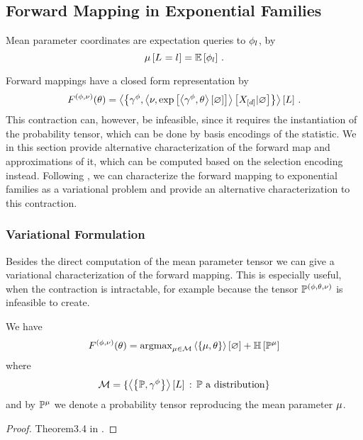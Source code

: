 \subsection{Forward Mapping in Exponential Families} 




Mean parameter coordinates are expectation queries to $\phi_{l}$, by 
	\[ \mu\left[L_{}=l_{}\right] = \mathbb{E}\left[\phi_{l}\right] \, . \]
	
Forward mappings have a closed form representation by
	\[ F^{(\phi,\nu)}(\theta)
	= \left\langle \left\{\gamma^{\phi},\left\langle \nu,\mathrm{exp}\left[\left\langle \gamma^{\phi},\theta\right\rangle \left[ \varnothing \right]\right]\right\rangle \left[ X_{[d]} | \varnothing \right]\right\}\right\rangle \left[ L \right] \, . \]
This contraction can, however, be infeasible, since it requires the instantiation of the probability tensor, which can be done by basis encodings of the statistic.
We in this section provide alternative characterization of the forward map and approximations of it, which can be computed based on the selection encoding instead.
Following \cite{wainwright_graphical_2008}, we can characterize the forward mapping to exponential families as a variational problem and provide an alternative characterization to this contraction.



\subsubsection{Variational Formulation}

Besides the direct computation of the mean parameter tensor we can give a variational characterization of the forward mapping.
This is especially useful, when the contraction is intractable, for example because the tensor $\mathbb{P}^{(\phi,\theta,\nu)}$ is infeasible to create.

\begin{theorem}
	We have
	\begin{align*}
		F^{(\phi,\nu)}(\theta)
		  = \mathrm{argmax}_{\mu\in\mathcal{M}}  \left\langle \left\{\mu,\theta\right\}\right\rangle \left[ \varnothing \right] + \mathbb{H}\left[\mathbb{P}^{\mu}\right] 
	\end{align*}
	where 
	\begin{align*}
		 \mathcal{M} = \{  \left\langle \left\{\mathbb{P},\gamma^{\phi}\right\}\right\rangle \left[ L \right] \, :  \,  \mathbb{P} \,\, \text{a distribution} \}
	\end{align*}
	and by $\mathbb{P}^{\mu}$ we denote a probability tensor reproducing the mean parameter $\mu$.
\end{theorem}
\begin{proof}
	Theorem3.4 in \cite{wainwright_graphical_2008}.
\end{proof}


